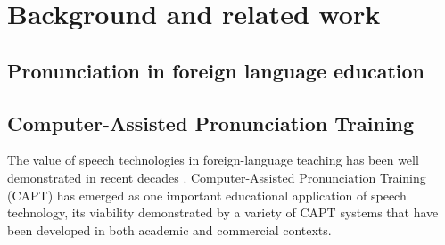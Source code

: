 %
%
\chapter{Background and related work}
\label{chap:background}



\section{Pronunciation in foreign language education}
\label{sec:bkgd:pron}

\citep{Derwing2005,Dlaska2013,Hirschfeld2007,Mehlhorn2005}

\section{Computer-Assisted Pronunciation Training} %
\label{sec:bkgd:capt}

	The value of speech technologies in foreign-language teaching has been well demonstrated in recent decades \citep{Eskenazi2009,Delmonte2011,Witt2012}. Computer-Assisted Pronunciation Training (CAPT) has emerged as one important educational application of speech technology, its viability demonstrated by a variety of CAPT systems that have been developed in both academic and commercial contexts. 

%	

%	
	
